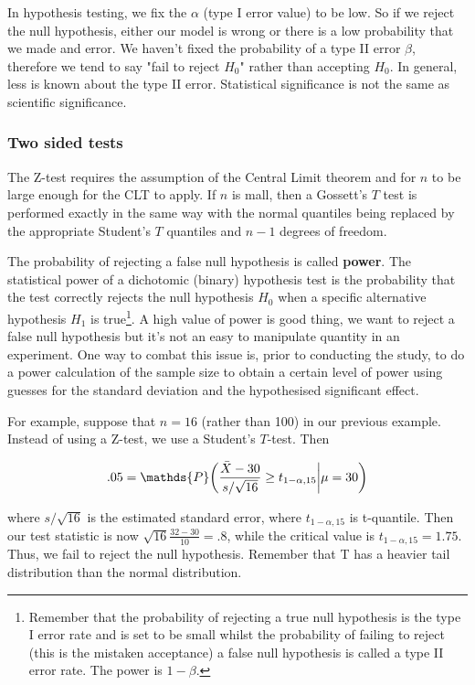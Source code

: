 \documentclass{homework}
\begin{document}
In hypothesis testing, we fix the $\alpha$ (type I error value) to be low. So if we reject the null hypothesis, either our model is wrong or there is a low probability that we made and error. We haven't fixed the probability of a type II error $\beta$, therefore we tend to say "fail to reject $H_0$" rather than accepting $H_0$. In general, less is known about the type II error. Statistical significance is not the same as scientific significance. 

\clearpage

\subsubsection{Two sided tests}

The Z-test requires the assumption of the Central Limit theorem and for $n$ to be large enough for the CLT to apply. If $n$ is mall, then a Gossett's $T$ test is performed exactly in the same way with the normal quantiles being replaced by the appropriate Student's $T$ quantiles and $n-1$ degrees of freedom. 

The probability of rejecting a false null hypothesis is called \textbf{power}. The statistical power of a dichotomic (binary) hypothesis test is the probability that the test correctly rejects the null hypothesis $H_0$ when a specific alternative hypothesis $H_1$ is true\footnote{Remember that the probability of rejecting a true null hypothesis is the type I error rate and is set to be small whilst the probability of failing to reject (this is the mistaken acceptance) a false null hypothesis is called a type II error rate. The power is $1-\beta$.}. A high value of power is good thing, we want to reject a false null hypothesis but it's not an easy to manipulate quantity in an experiment. One way to combat this issue is, prior to conducting the study, to do a power calculation of the sample size to obtain a certain level of power using guesses for the standard deviation and the hypothesised significant effect.

For example, suppose that $n=16$ (rather than 100) in our previous example. Instead of using a Z-test, we use a Student's $T$-test. Then 

$$
.05 = \mathds{P}\bigg(\frac{\Bar{X}-30}{s/\sqrt{16}} \geq t_{1-\alpha, 15} \bigg| \mu = 30\bigg)
$$

where $s/\sqrt{16}$ is the estimated standard error, where $t_{1-\alpha, 15}$ is t-quantile. Then our test statistic is now $\sqrt{16}\frac{32-30}{10} = .8$, while the critical value is $t_{1-\alpha, 15} = 1.75$. Thus, we fail to reject the null hypothesis. Remember that T has a heavier tail distribution than the normal distribution.
\end{document}
